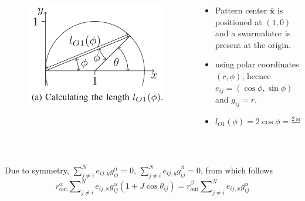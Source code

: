 \documentclass[10pt,aspectratio=43,mathserif,table]{beamer}
\begin{document}
\begin{frame}
    \begin{columns}
        \begin{column}{0.4\textwidth}
            \begin{figure}
                \centering
                \includegraphics[width=\textwidth]{f2a.png}
            \end{figure}
        \end{column}
        \begin{column}{0.6\textwidth}
            \footnotesize
            \begin{itemize}
                \item Pattern center $\bar{\boldsymbol{x}}$ is positioned at $(1, 0)$ and a swarmalator is present at the origin.
                \item using polar coordinates $(r, \phi)$, hecnce $e_{ij}=\left( \cos \phi ,\sin \phi  \right)$ and $g_{ij}=r$.
                \item $
                l_{O1}\left( \phi \right) =2\cos \phi =\frac{2\sin \phi \cos \phi}{\sin \phi}=\frac{\sin 2\phi}{\sin \phi}
                $
            \end{itemize}
            
        \end{column}
    \end{columns}
    
    $ $

    Due to symmetry, $\sum\nolimits_{j\ne i}^N{e_{ij,y}g_{ij}^{\alpha}}=0$, $\sum\nolimits_{j\ne i}^N{e_{ij,y}g_{ij}^{\beta}}=0$,  
    from which follows $$r_{\mathrm{out}}^{\alpha}\sum\nolimits_{j\ne i}^N{e_{ij,x}g_{ij}^{\alpha}\left( 1+J\cos \theta _{ij} \right)}=r_{\mathrm{out}}^{\beta}\sum\nolimits_{j\ne i}^N{e_{ij,x}g_{ij}^{\alpha}}$$


\end{frame}
\end{document}

